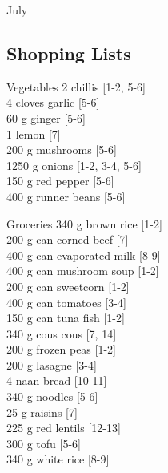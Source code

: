 \begin{menu}{July}
    \subsection*{Shopping Lists}
      \begin{shoppinglist}{Vegetables}
      2  chillis {\scriptsize[1-2, 5-6]}\\
      4 cloves garlic {\scriptsize[5-6]}\\
      60 g ginger {\scriptsize[5-6]}\\
      1  lemon {\scriptsize[7]}\\
      200 g mushrooms {\scriptsize[5-6]}\\
      1250 g onions {\scriptsize[1-2, 3-4, 5-6]}\\
      150 g red pepper {\scriptsize[5-6]}\\
      400 g runner beans {\scriptsize[5-6]}\\
      \end{shoppinglist}%
      \begin{shoppinglist}{Groceries}
      340 g brown rice {\scriptsize[1-2]}\\
      200 g can corned beef {\scriptsize[7]}\\
      400 g can evaporated milk {\scriptsize[8-9]}\\
      400 g can mushroom soup {\scriptsize[1-2]}\\
      200 g can sweetcorn {\scriptsize[1-2]}\\
      400 g can tomatoes {\scriptsize[3-4]}\\
      150 g can tuna fish {\scriptsize[1-2]}\\
      340 g cous cous {\scriptsize[7, 14]}\\
      200 g frozen peas {\scriptsize[1-2]}\\
      200 g lasagne {\scriptsize[3-4]}\\
      4  naan bread {\scriptsize[10-11]}\\
      340 g noodles {\scriptsize[5-6]}\\
      25 g raisins {\scriptsize[7]}\\
      225 g red lentils {\scriptsize[12-13]}\\
      300 g tofu {\scriptsize[5-6]}\\
      340 g white rice {\scriptsize[8-9]}\\
      \end{shoppinglist}%
      \par\vfil %

\end{menu}
